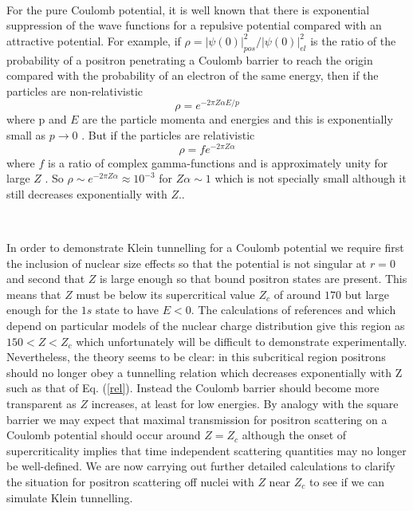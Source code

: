 \smallskip\ 

\noindent For the pure Coulomb potential, it is well known that there is
exponential suppression of the wave functions for a repulsive potential
compared with an attractive potential. For example, if $\rho =\left| \psi
(0)\right| _{pos}^2/\left| \psi (0)\right| _{el}^2$ is the ratio of the
probability of a positron penetrating a Coulomb barrier to reach the origin
compared with the probability of an electron of the same energy, then if the
particles are non-relativistic 
\begin{equation}
\rho =e^{-2\pi Z\alpha E/p}  \label{nonrel}
\end{equation}
\noindent where p and $E$ are the particle momenta and energies and this is
exponentially small as $p\rightarrow 0$ \cite{LL}. But if the particles are
relativistic \cite{rose} 
\begin{equation}
\rho =fe^{-2\pi Z\alpha }  \label{rel}
\end{equation}
\noindent where $f$ is a ratio of complex gamma-functions and is
approximately unity for large $Z$ . So $\rho \sim e^{-2\pi Z\alpha }\approx
10^{-3}$ for $Z\alpha \sim 1$ which is not specially small although it still
decreases exponentially with $Z..$

\smallskip\ 

\noindent In order to demonstrate Klein tunnelling for a Coulomb potential
we require first the inclusion of nuclear size effects so that the potential
is not singular at $r=0$ and second that $Z$ is large enough so that bound
positron states are present. This means that $Z$ must be below its
supercritical value $Z_c$ of around $170$ but large enough for the $1s$
state to have $E<0$. The calculations of references \cite{zeld} and \cite
{grein2} which depend on particular models of the nuclear charge
distribution give this region as $150<Z<Z_c$ which unfortunately will be
difficult to demonstrate experimentally. Nevertheless, the theory seems to
be clear: in this subcritical region positrons should no longer obey a
tunnelling relation which decreases exponentially with Z such as that of Eq.
(\ref{rel}). Instead the Coulomb barrier should become more transparent as $%
Z $ increases, at least for low energies. By analogy with the square barrier
we may expect that maximal transmission for positron scattering on a Coulomb
potential should occur around $Z=Z_c$ although the onset of supercriticality
implies that time independent scattering quantities may no longer be
well-defined. We are now carrying out further detailed calculations to
clarify the situation for positron scattering off nuclei with $Z$ near $Z_c$
to see if we can simulate Klein tunnelling.

